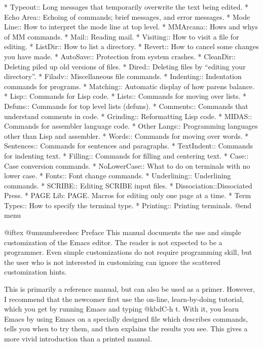 * Typeout::     Long messages that temporarily overwrite the text being edited.
* Echo Area::   Echoing of commands; brief messages, and error messages.
* Mode Line::   How to interpret the mode line at top level.
* MMArcana::    Hows and whys of MM commands.
* Mail::        Reading mail.
* Visiting::    How to visit a file for editing.
* ListDir::     How to list a directory.
* Revert::      How to cancel some changes you have made.
* AutoSave::    Protection from system crashes.
* CleanDir::    Deleting piled up old versions of files.
* Dired::       Deleting files by ``editing your directory''.
* Filadv::      Miscellaneous file commands.
* Indenting::   Indentation commands for programs.
* Matching::    Automatic display of how parens balance.
* Lisp::        Commands for Lisp code.
* Lists::       Commands for moving over lists.
* Defuns::      Commands for top level lists (defuns).
* Comments::    Commands that understand comments in code.
* Grinding::    Reformatting Lisp code.
* MIDAS::       Commands for assembler language code.
* Other Langs:: Programming languages other than Lisp and assembler.
* Words::       Commands for moving over words.
* Sentences::   Commands for sentences and paragraphs.
* TextIndent::  Commands for indenting text.
* Filling::     Commands for filling and centering text.
* Case::        Case conversion commands.
* NoLowerCase:: What to do on terminals with no lower case.
* Fonts::       Font change commands.
* Underlining:: Underlining commands.
* SCRIBE::      Editing SCRIBE input files.
* Dissociation::Dissociated Press.
* PAGE Lib: PAGE.       Macros for editing only one page at a time.
* Term Types::  How to specify the terminal type.
* Printing::    Printing terminals.
@end menu

@iftex
@unnumberedsec Preface
  This manual documents the use and simple customization of the
Emacs editor.  The reader is not expected to be a programmer.  Even simple
customizations do not require programming skill, but the user who is not
interested in customizing can ignore the scattered customization hints.

  This is primarily a reference manual, but can also be used as a
primer.  However, I recommend that the newcomer first use the on-line,
learn-by-doing tutorial, which you get by running Emacs and typing
@kbd{C-h t}.  With it, you learn Emacs by using Emacs on a specially
designed file which describes commands, tells you when to try them,
and then explains the results you see.  This gives a more vivid
introduction than a printed manual.

